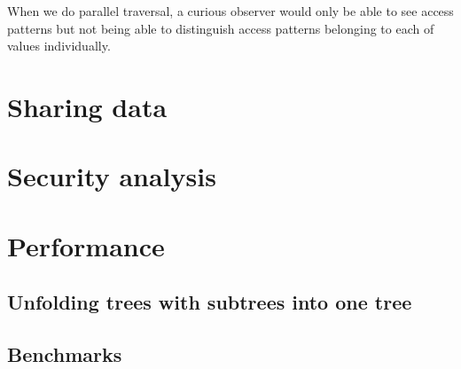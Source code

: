 \documentclass[notitlepage]{revtex4-1}
\begin{document}
When we do parallel traversal, a curious observer would only be able to see access patterns but not being able to distinguish access patterns belonging to each of values individually.

\section{Sharing data}

\section{Security analysis}

\section{Performance}

\subsection{Unfolding trees with subtrees into one tree}

\subsection{Benchmarks}


\end{document}
